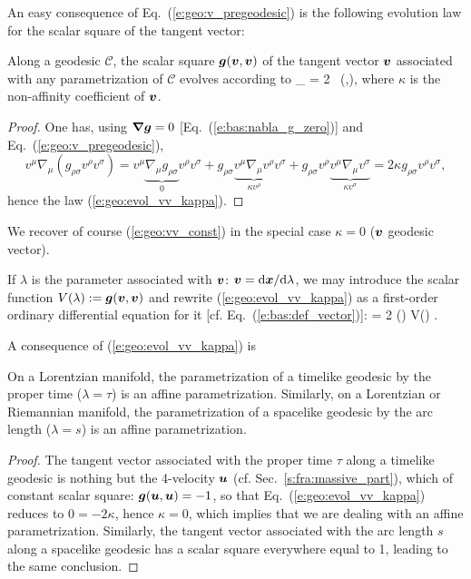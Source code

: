 An easy consequence of Eq.~(\ref{e:geo:v_pregeodesic}) is the following
evolution law for the scalar square of the tangent vector:
\begin{greybox}
Along a geodesic $\mathcal{C}$, the scalar square $\bm{g}(\bm{v},\bm{v})$
of the tangent vector $\bm{v}$ associated with any parametrization of $\mathcal{C}$
evolves according to
\be \label{e:geo:evol_vv_kappa}
    \wnab_{} \left[ \w{g}(\w{v},\w{v}) \right] = 2 \kappa \, (,),
\ee
where $\kappa$ is the non-affinity coefficient of $\bm{v}$.
\end{greybox}
\begin{proof}
One has, using $\bm{\nabla}\bm{g}=0$ [Eq.~(\ref{e:bas:nabla_g_zero})] and Eq.~(\ref{e:geo:v_pregeodesic}),
\[
    v^\mu \nabla_\mu (g_{\rho\sigma} v^\rho v^\sigma)  = v^\mu \underbrace{\nabla_\mu g_{\rho\sigma}}_{0} v^\rho v^\sigma
                + g_{\rho\sigma} \underbrace{v^\mu \nabla_\mu v^\rho}_{\kappa v^\rho} v^\sigma
                + g_{\rho\sigma} v^\rho \underbrace{v^\mu \nabla_\mu v^\sigma}_{\kappa v^\sigma}
             = 2 \kappa  g_{\rho\sigma} v^\rho v^\sigma  ,
\]
hence the law (\ref{e:geo:evol_vv_kappa}).
\end{proof}
We recover of course (\ref{e:geo:vv_const}) in the special case $\kappa = 0$
($\bm{v}$ geodesic vector).
\begin{remark}
If $\lambda$ is the parameter associated with $\bm{v}$: $\bm{v} = \mathrm{d}\bm{x}/\mathrm{d}\lambda$,
we may introduce the scalar function $V(\lambda) := \bm{g}(\bm{v},\bm{v})$ and
rewrite (\ref{e:geo:evol_vv_kappa}) as a first-order ordinary differential equation
for it [cf. Eq.~(\ref{e:bas:def_vector})]:
\be
     = 2 \kappa(\lambda) V(\lambda) .
\ee
\end{remark}
A consequence of (\ref{e:geo:evol_vv_kappa}) is
\begin{greybox}
On a Lorentzian manifold, the parametrization of a timelike geodesic
by the proper time ($\lambda = \tau$) is an affine parametrization.
Similarly, on a Lorentzian or Riemannian manifold, the parametrization of a
spacelike geodesic
by the arc length ($\lambda = s$) is an affine parametrization.
\end{greybox}
\begin{proof}
The tangent vector associated with the proper time $\tau$ along a timelike geodesic
is nothing but the 4-velocity $\bm{u}$ (cf. Sec.~\ref{s:fra:massive_part}), which
of constant scalar square: $\bm{g}(\bm{u},\bm{u}) = -1$, so that Eq.~(\ref{e:geo:evol_vv_kappa})
reduces to $0 = -2 \kappa$, hence $\kappa=0$, which implies that we are dealing
with an affine parametrization. Similarly, the tangent vector associated with the
arc length $s$ along a spacelike geodesic has a scalar square everywhere equal
to 1, leading to the same conclusion.
\end{proof}


